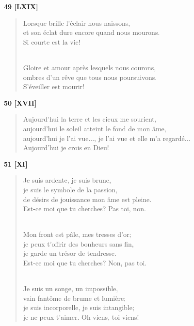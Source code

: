 \documentclass[a4paper,11pt]{book}
\begin{document}
\bigskip

\begin{center} {\bf 49 [LXIX]} \end{center}

\begin{verse}
Lorsque brille l'éclair nous naissons, \\
et son éclat dure encore quand nous mourons. \\
Si courte est la vie! \\ \

Gloire et amour après lesquels nous courons, \\
ombres d'un rêve que tous nous poursuivons. \\
S'éveiller est mourir! \\
\end{verse}

\bigskip

\begin{center} {\bf 50 [XVII]} \end{center}

\begin{verse}
Aujourd'hui la terre et les cieux me sourient, \\
aujourd'hui le soleil atteint le fond de mon âme, \\
aujourd'hui je l'ai vue..., je l'ai vue et elle m'a regardé... \\
Aujourd'hui je crois en Dieu! \\
\end{verse}

\bigskip

\begin{center} {\bf 51 [XI]} \end{center}

\begin{verse}
Je suis ardente, je suis brune, \\
je suis le symbole de la passion, \\
de désirs de jouissance mon âme est pleine. \\
Est-ce moi que tu cherches? Pas toi, non. \\ \

Mon front est pâle, mes tresses d'or; \\
je peux t'offrir des bonheurs sans fin, \\
je garde un trésor de tendresse. \\
Est-ce moi que tu cherches? Non, pas toi. \\ \

Je suis un songe, un impossible, \\
vain fantôme de brume et lumière; \\
je suis incorporelle, je suis intangible; \\
je ne peux t'aimer. Oh viens, toi viens! \\
\end{verse}
\end{document}
